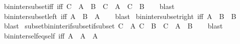 \begin{isabellebody}
%
\isadelimproof
\isanewline
%
\endisadelimproof
\isanewline
{}\isamarkupfalse%
\ bin{\isacharunderscore}{\kern0pt}inter{\isacharunderscore}{\kern0pt}subset{\isacharunderscore}{\kern0pt}iff\ {\isacharbrackleft}{\kern0pt}iff{\isacharbrackright}{\kern0pt}{\isacharcolon}{\kern0pt}\ {\isachardoublequoteopen}C\ {\isasymsubseteq}\ A\ {\isasyminter}\ B\ {\isasymlongleftrightarrow}\ C\ {\isasymsubseteq}\ A\ {\isasymand}\ C\ {\isasymsubseteq}\ B{\isachardoublequoteclose}\isanewline
%
\isadelimproof
\ \ %
\endisadelimproof
%
\isatagproof
{}\isamarkupfalse%
\ blast%
\endisatagproof
{\isafoldproof}%
%
\isadelimproof
\isanewline
%
\endisadelimproof
\isanewline
{}\isamarkupfalse%
\ bin{\isacharunderscore}{\kern0pt}inter{\isacharunderscore}{\kern0pt}subset{\isacharunderscore}{\kern0pt}left\ {\isacharbrackleft}{\kern0pt}iff{\isacharbrackright}{\kern0pt}{\isacharcolon}{\kern0pt}\ {\isachardoublequoteopen}A\ {\isasyminter}\ B\ {\isasymsubseteq}\ A{\isachardoublequoteclose}\isanewline
%
\isadelimproof
\ \ %
\endisadelimproof
%
\isatagproof
{}\isamarkupfalse%
\ blast%
\endisatagproof
{\isafoldproof}%
%
\isadelimproof
\isanewline
%
\endisadelimproof
\isanewline
{}\isamarkupfalse%
\ bin{\isacharunderscore}{\kern0pt}inter{\isacharunderscore}{\kern0pt}subset{\isacharunderscore}{\kern0pt}right\ {\isacharbrackleft}{\kern0pt}iff{\isacharbrackright}{\kern0pt}{\isacharcolon}{\kern0pt}\ {\isachardoublequoteopen}A\ {\isasyminter}\ B\ {\isasymsubseteq}\ B{\isachardoublequoteclose}\isanewline
%
\isadelimproof
\ \ %
\endisadelimproof
%
\isatagproof
{}\isamarkupfalse%
\ blast%
\endisatagproof
{\isafoldproof}%
%
\isadelimproof
\isanewline
%
\endisadelimproof
\isanewline
{}\isamarkupfalse%
\ subset{\isacharunderscore}{\kern0pt}bin{\isacharunderscore}{\kern0pt}inter{\isacharunderscore}{\kern0pt}if{\isacharunderscore}{\kern0pt}subset{\isacharunderscore}{\kern0pt}if{\isacharunderscore}{\kern0pt}subset{\isacharcolon}{\kern0pt}\ {\isachardoublequoteopen}{\isasymlbrakk}C\ {\isasymsubseteq}\ A{\isacharsemicolon}{\kern0pt}\ C\ {\isasymsubseteq}\ B{\isasymrbrakk}\ {\isasymLongrightarrow}\ C\ {\isasymsubseteq}\ A\ {\isasyminter}\ B{\isachardoublequoteclose}\isanewline
%
\isadelimproof
\ \ %
\endisadelimproof
%
\isatagproof
{}\isamarkupfalse%
\ blast%
\endisatagproof
{\isafoldproof}%
%
\isadelimproof
\isanewline
%
\endisadelimproof
\isanewline
{}\isamarkupfalse%
\ bin{\isacharunderscore}{\kern0pt}inter{\isacharunderscore}{\kern0pt}self{\isacharunderscore}{\kern0pt}eq{\isacharunderscore}{\kern0pt}self\ {\isacharbrackleft}{\kern0pt}iff{\isacharbrackright}{\kern0pt}{\isacharcolon}{\kern0pt}\ {\isachardoublequoteopen}A\ {\isasyminter}\ A\ {\isacharequal}{\kern0pt}\ A{\isachardoublequoteclose}\isanewline

\end{isabellebody}
